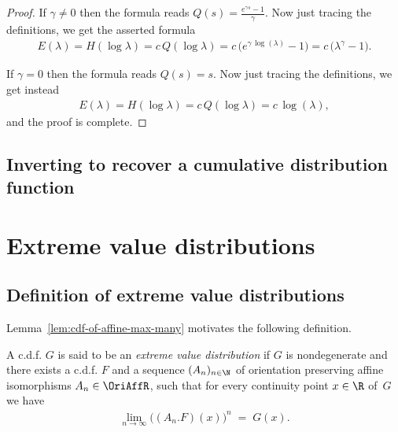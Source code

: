 \begin{proof}
  If $\gamma \ne 0$ then the formula reads
  $Q(s) = \frac{e^{\gamma s} - 1}{\gamma}$.
  Now just tracing the definitions, we get the asserted formula
  \begin{align*}
  E(\lambda) = H(\log \lambda)
    = c \, Q(\log \lambda) = c \, \big( e^{\gamma \, \log(\lambda)} - 1 \big)
    = c \, \big( \lambda^{\gamma} - 1 \big) .
  \end{align*}

  If $\gamma = 0$ then the formula reads $Q(s) = s$.
  Now just tracing the definitions, we get instead
  \begin{align*}
  E(\lambda) = H(\log \lambda)
    = c \, Q(\log \lambda) = c \, \log(\lambda) ,
  \end{align*}
  and the proof is complete.
\end{proof}


\section{Inverting to recover a cumulative distribution function}



\chapter{Extreme value distributions}

\section{Definition of extreme value distributions}

Lemma~\ref{lem:cdf-of-affine-max-many} motivates the following definition.

\begin{definition}
  \label{def:extr-val-distr}
  \leanok
  A c.d.f. $G$ is said to be an \emph{extreme value distribution} if
  $G$ is nondegenerate and
  there exists a c.d.f. $F$ and a sequence $(A_n)_{n \in \N}$ of orientation
  preserving affine isomorphisms $A_n \in \OriAffR$, such that
  for every continuity point $x \in \R$ of~$G$ we have
  \begin{align*}
  \lim_{n \to \infty} \big( (A_n.F)(x) \big)^n \; = \; G(x) .
  \end{align*}
\end{definition}

